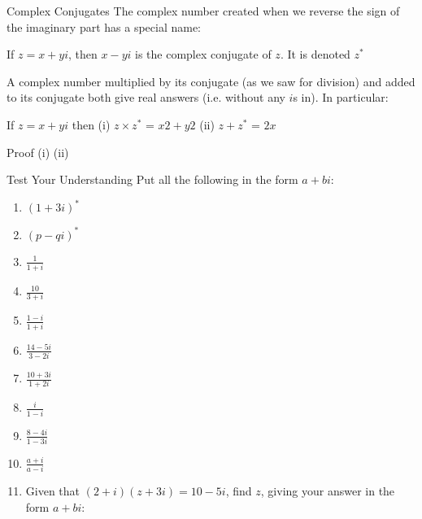 \documentclass{beamer}
\begin{document}
	\begin{frame}[shrink=15]{Complex Conjugates}
        The complex number created when we reverse  the sign of the imaginary part has a special name:
        
        \begin{definition}
            If $z = x + yi$, then $x-yi$ is the complex conjugate of $z$. It is denoted $z^*$
        \end{definition}
        
        A complex number multiplied by its conjugate (as we saw for division) and added to its conjugate both give real answers (i.e. without any $i$s in). In particular:
        
        \begin{definition}
            If $z=x+yi$ then
            (i) $z \times z^*$  = $x2 + y2$
            (ii) $z + z^*$  = $2x$
        \end{definition}
        
        Proof
        (i) 
        (ii) 
    \end{frame}
    
	\begin{frame}[shrink=15]{Test Your Understanding}
	    Put all the following in the form $a+bi$:
	    \begin{enumerate}[label={(\alph*)}]
	        \item $(1+3i)^*$ 
	        \item $(p-qi)^*$ 
	        \item $\frac{1}{1+i}$ 
	        \item $\frac{10}{3+i}$ 
	        \item $\frac{1-i}{1+i}$ 
	        \item $\frac{14-5i}{3-2i}$ 
	        \item $\frac{10+3i}{1+2i}$ 
	        \item $\frac{i}{1-i}$ 
	        \item $\frac{8-4i}{1-3i}$ 
	        \item $\frac{a+i}{a-i}$ 
	        \item Given that $(2 + i)(z + 3i) = 10 - 5i$, find $z$, giving your answer in the form $a + bi$:
	    \end{enumerate}
    \end{frame}
    
\end{document}
